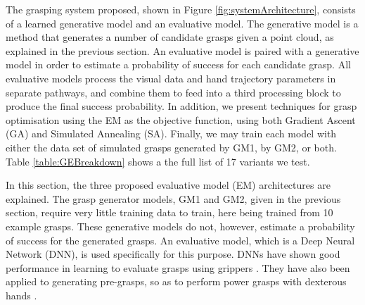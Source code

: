 \noindent
The grasping system proposed, shown in Figure \ref{fig:systemArchitecture}, consists of a learned generative model and an evaluative model. The generative model is a method that generates a number of candidate grasps given a point cloud, as explained in the previous section. An evaluative model is paired with a generative model in order to estimate a probability of success for each candidate grasp. All evaluative models process the visual data and hand trajectory parameters in separate pathways, and combine them to feed into a third processing block to produce the final success probability. In addition, we present techniques for grasp optimisation using the EM as the objective function, using both Gradient Ascent (GA) and Simulated Annealing (SA). Finally, we may train each model with either the data set of simulated grasps generated by GM1, by GM2, or both. Table \ref{table:GEBreakdown} shows a the full list of 17 variants we test.

In this section, the three proposed evaluative model (EM) architectures are explained. The grasp generator models, GM1 and GM2, given in the previous section, require very little training data to train, here being trained from 10 example grasps. %
These generative models do not, however, estimate a probability of success for the generated grasps. An evaluative model, which is a Deep Neural Network (DNN), is used specifically for this purpose. DNNs have shown good performance in learning to evaluate grasps using grippers \cite{levine16,lenz2015deep}. They have also been applied to generating pre-grasps, so as to perform power grasps with dexterous hands \cite{varley2015generating,lu2017planning}.


